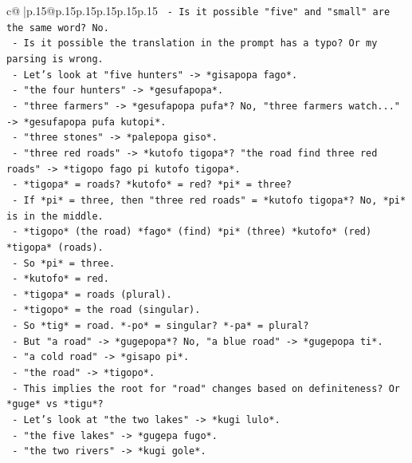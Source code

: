 \documentclass{article}
\begin{document}
{\begin{supertabular}{c@{$\;$}|p{.15\linewidth}@{}p{.15\linewidth}p{.15\linewidth}p{.15\linewidth}p{.15\linewidth}p{.15\linewidth}}
{{{\texttt{           {-} Is it possible "five" and "small" are the same word? No.} \\
\texttt{           {-} Is it possible the translation in the prompt has a typo? Or my parsing is wrong.} \\
\texttt{           {-} Let's look at "five hunters" {-}> *gisapopa fago*.} \\
\texttt{           {-} "the four hunters" {-}> *gesufapopa*.} \\
\texttt{           {-} "three farmers" {-}> *gesufapopa pufa*? No, "three farmers watch..." {-}> *gesufapopa pufa kutopi*.} \\
\texttt{           {-} "three stones" {-}> *palepopa giso*.} \\
\texttt{           {-} "three red roads" {-}> *kutofo tigopa*? "the road find three red roads" {-}> *tigopo fago pi kutofo tigopa*.} \\
\texttt{             {-} *tigopa* = roads? *kutofo* = red? *pi* = three?} \\
\texttt{             {-} If *pi* = three, then "three red roads" = *kutofo tigopa*? No, *pi* is in the middle.} \\
\texttt{             {-} *tigopo* (the road) *fago* (find) *pi* (three) *kutofo* (red) *tigopa* (roads).} \\
\texttt{             {-} So *pi* = three.} \\
\texttt{             {-} *kutofo* = red.} \\
\texttt{             {-} *tigopa* = roads (plural).} \\
\texttt{             {-} *tigopo* = the road (singular).} \\
\texttt{             {-} So *tig* = road. *{-}po* = singular? *{-}pa* = plural?} \\
\texttt{             {-} But "a road" {-}> *gugepopa*? No, "a blue road" {-}> *gugepopa ti*.} \\
\texttt{             {-} "a cold road" {-}> *gisapo pi*.} \\
\texttt{             {-} "the road" {-}> *tigopo*.} \\
\texttt{             {-} This implies the root for "road" changes based on definiteness? Or *guge* vs *tigu*?} \\
\texttt{             {-} Let's look at "the two lakes" {-}> *kugi lulo*.} \\
\texttt{             {-} "the five lakes" {-}> *gugepa fugo*.} \\
\texttt{             {-} "the two rivers" {-}> *kugi gole*.} \\
}}}
\end{supertabular}}
\end{document}
